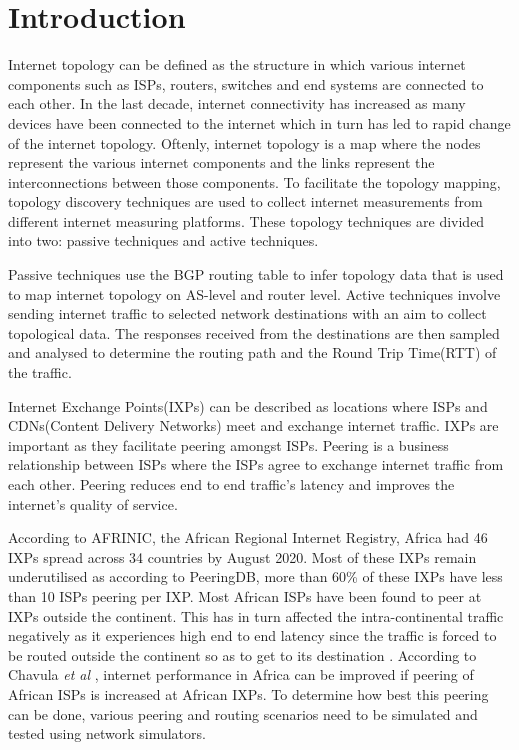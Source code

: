 \section{Introduction}\label{sec:introduction}
Internet topology can be defined as the structure in which various internet components such as ISPs, routers, switches and end systems are connected to each other\cite{encyclopedia1}. In the last decade, internet connectivity has increased as many devices have been connected to the internet which in turn has led to rapid change of the internet topology. Oftenly, internet topology is a map where the nodes represent the various internet components and the links represent the interconnections between those components. To facilitate the topology mapping, topology discovery techniques are used to collect internet measurements from different internet measuring platforms\cite{Donnet2007}. These topology techniques are divided into two: passive techniques and active techniques.

Passive techniques use the BGP routing table to infer topology data that is used to map internet topology on AS-level and router level. Active techniques involve sending internet traffic to selected network destinations with an aim to collect topological data. The responses received from the destinations are then sampled and analysed to determine the routing path and the Round Trip Time(RTT) of the traffic\cite{Donnet2007}. 

Internet Exchange Points(IXPs) can be described as locations where ISPs and CDNs(Content Delivery Networks) meet and exchange internet traffic\cite{effectsofIXPS}. IXPs are important as they facilitate peering amongst ISPs\cite{effectsofIXPS}. Peering is a business relationship between ISPs where the ISPs agree to exchange internet traffic from each other. Peering reduces end to end traffic’s latency and improves the internet’s quality of service. 

According to AFRINIC\cite{Africanp74:online}, the African Regional Internet Registry, Africa had 46 IXPs spread across 34 countries by August 2020. Most of these IXPs remain underutilised as according to PeeringDB\cite{PeeringD7:online}, more than 60\% of these IXPs have less than 10 ISPs peering per IXP.  Most African ISPs have been found to peer at IXPs outside the continent. This has in turn affected the intra-continental traffic negatively as it experiences high end to end latency since the traffic is forced to be routed outside the continent so as to get to its destination \cite{africanet1}. According to Chavula \textit{et al} \cite{Africa2}, internet performance in Africa can be improved if peering of African ISPs is increased at African IXPs. To determine how best this peering can be done, various peering and routing  scenarios need to be simulated and tested using network simulators. 

